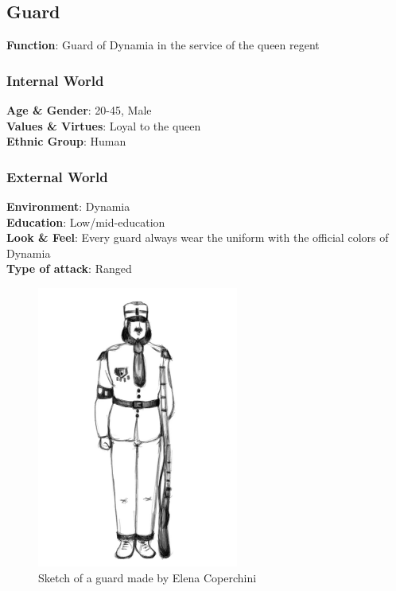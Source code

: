 \subsection{Guard}

\begin{minipage}{0.5\textwidth}
\textbf{Function}: Guard of Dynamia in the service of the queen regent

\subsubsection{Internal World}

\textbf{Age \& Gender}: 20-45, Male \\
\textbf{Values \& Virtues}: Loyal to the queen\\
\textbf{Ethnic Group}: Human

\subsubsection{External World}
\textbf{Environment}: Dynamia \\
\textbf{Education}: Low/mid-education \\
\textbf{Look \& Feel}: Every guard always wear the uniform with the official colors of Dynamia \\
\textbf{Type of attack}: Ranged \\
\end{minipage}%
%
\hfill\begin{minipage}{0.4\textwidth}
  \begin{figure}[H]
  \includegraphics{Images/Characters/guard_portrait}
  \caption{Sketch of a guard made by Elena Coperchini}
  \end{figure}
\end{minipage}


